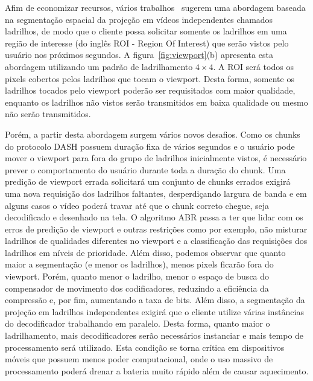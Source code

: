 Afim de economizar recursos, vários trabalhos~\cite{Alface2012, Zare2016, Qian2018, Liu2017, Graf2017, Xiao2018, Nasrabadi2019} sugerem uma abordagem baseada na segmentação espacial da projeção em vídeos independentes chamados ladrilhos, de modo que o cliente possa solicitar somente os ladrilhos em uma região de interesse (do inglês ROI - Region Of Interest) que serão vistos pelo usuário nos próximos segundos. A figura~\ref{fig:viewport}(b) apresenta esta abordagem utilizando um padrão de ladrilhamento $4 \times 4$. A ROI será todos os pixels cobertos pelos ladrilhos que tocam o viewport. Desta forma, somente os ladrilhos tocados pelo viewport poderão ser requisitados com maior qualidade, enquanto os ladrilhos não vistos serão transmitidos em baixa qualidade ou mesmo não serão transmitidos. 

Porém, a partir desta abordagem surgem vários novos desafios. Como os chunks do protocolo DASH possuem duração fixa de vários segundos e o usuário pode mover o viewport para fora do grupo de ladrilhos inicialmente vistos, é necessário prever o comportamento do usuário durante toda a duração do chunk. Uma predição de viewport errada solicitará um conjunto de chunks errados exigirá uma nova requisição dos ladrilhos faltantes, desperdiçando largura de banda e em alguns casos o vídeo poderá travar até que o chunk correto chegue, seja decodificado e desenhado na tela. O algoritmo ABR passa a ter que lidar com os erros de predição de viewport e outras restrições como por exemplo, não misturar ladrilhos de qualidades diferentes no viewport e a classificação das requisições dos ladrilhos em níveis de prioridade. Além disso, podemos observar que quanto maior a segmentação (e menor os ladrilhos), menos pixels ficarão fora do viewport. Porém, quanto menor o ladrilho, menor o espaço de busca do compensador de movimento dos codificadores, reduzindo a eficiência da compressão e, por fim, aumentando a taxa de bits. Além disso, a segmentação da projeção em ladrilhos independentes exigirá que o cliente utilize várias instâncias do decodificador trabalhando em paralelo. Desta forma, quanto maior o ladrilhamento, mais decodificadores serão necessários instanciar e mais tempo de processamento será utilizado. Esta condição se torna crítica em dispositivos móveis que possuem menos poder computacional, onde o uso massivo de processamento poderá drenar a bateria muito rápido além de causar aquecimento.


